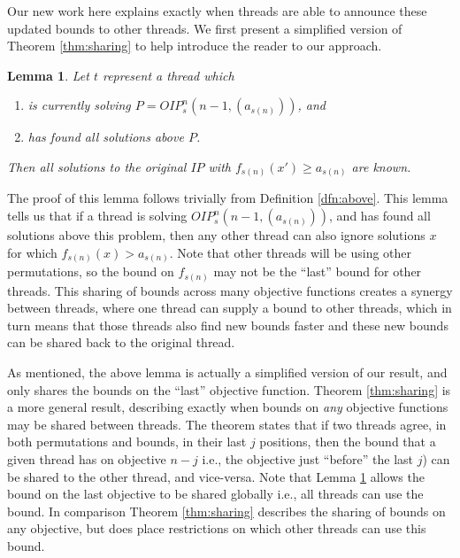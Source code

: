 \documentclass{amsart}
\newtheorem{lemma}{Lemma}
\theoremstyle{definition}
\begin{document}
Our new work here explains exactly when threads are able to announce these updated bounds to other threads.
We first present a simplified version of Theorem \ref{thm:sharing} to help introduce the reader to our approach.

\begin{lemma}\label{lemma:sharing-simple}
  Let $t$ represent a thread which
  \begin{enumerate}
    \item is currently solving 
   $P = {O\!I\!P}^n_s(n-1,(a_{s(n)}))$, and
 \item has found all solutions above $P$.
  \end{enumerate}
  Then all solutions to the original ${I\!P}$ with $f_{s(n)}(x') \geq a_{s(n)}$ are known.
\end{lemma}

The proof of this lemma follows trivially from Definition \ref{dfn:above}.
This lemma tells us that if a thread is solving ${O\!I\!P}^n_s(n-1,(a_{s(n)}))$, and has found all solutions above this problem, then any other thread can also ignore solutions $x$ for which $f_{s(n)}(x) > a_{s(n)}$.
Note that other threads will be using other permutations, so the bound on $f_{s(n)}$ may not be the ``last'' bound for other threads.
This sharing of bounds across many objective functions creates a synergy between threads, where one thread can supply a bound to other threads, which in turn means that those threads also find new bounds faster and these new bounds can be shared back to the original thread.

As mentioned, the above lemma is actually a simplified version of our result, and only shares the bounds on the ``last'' objective function.
Theorem \ref{thm:sharing} is a more general result, describing exactly when bounds on {\em any} objective functions may be shared between threads.
The theorem states that if two threads agree, in both permutations and bounds, in their last $j$ positions, then the bound that a given thread has on objective $n-j$ i.e., the objective just ``before'' the last $j$) can be shared to the other thread, and vice-versa.
Note that Lemma \ref{lemma:sharing-simple} allows the bound on the last objective to be shared globally i.e., all threads can use the bound.
In comparison Theorem \ref{thm:sharing} describes the sharing of bounds on any objective, but does place restrictions on which other threads can use this bound.
\end{document}
